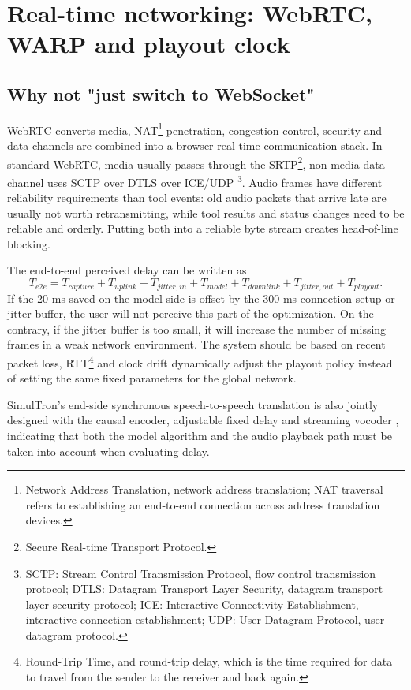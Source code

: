 \documentclass[UTF8,fontset=none,a4paper,10pt]{ctexart}
\begin{document}
\section{Real-time networking: WebRTC, WARP and playout clock}

\subsection{Why not "just switch to WebSocket"}

WebRTC converts media, NAT\footnote{Network Address Translation, network address translation; NAT traversal refers to establishing an end-to-end connection across address translation devices. } penetration, congestion control, security and data channels are combined into a browser real-time communication stack. In standard WebRTC, media usually passes through the SRTP\footnote{Secure Real-time Transport Protocol. }, non-media data channel uses SCTP over DTLS over ICE/UDP \footnote{SCTP: Stream Control Transmission Protocol, flow control transmission protocol; DTLS: Datagram Transport Layer Security, datagram transport layer security protocol; ICE: Interactive Connectivity Establishment, interactive connection establishment; UDP: User Datagram Protocol, user datagram protocol. }\cite{alvestrand2021webrtc,jesup2021datachannels}. Audio frames have different reliability requirements than tool events: old audio packets that arrive late are usually not worth retransmitting, while tool results and status changes need to be reliable and orderly. Putting both into a reliable byte stream creates head-of-line blocking.

The end-to-end perceived delay can be written as
\begin{equation}
T_{e2e}=T_{capture}+T_{uplink}+T_{jitter,in}+T_{model}+T_{downlink}+T_{jitter,out}+T_{playout}.
\end{equation}
If the 20 ms saved on the model side is offset by the 300 ms connection setup or jitter buffer, the user will not perceive this part of the optimization. On the contrary, if the jitter buffer is too small, it will increase the number of missing frames in a weak network environment. The system should be based on recent packet loss, RTT\footnote{Round-Trip Time, and round-trip delay, which is the time required for data to travel from the sender to the receiver and back again. } and clock drift dynamically adjust the playout policy instead of setting the same fixed parameters for the global network.

SimulTron's end-side synchronous speech-to-speech translation is also jointly designed with the causal encoder, adjustable fixed delay and streaming vocoder \cite{agranovich2024simultron}, indicating that both the model algorithm and the audio playback path must be taken into account when evaluating delay.
\end{document}
